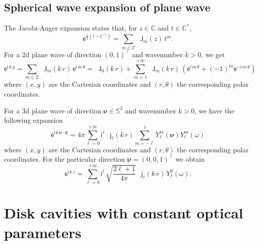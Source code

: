 \documentclass[12pt,a4paper]{article}
\theoremstyle{definition}
\theoremstyle{plain}
\theoremstyle{remark}
\newcommand{\bbC}{\mathbb{C}}
\newcommand{\bbS}{\mathbb{S}}
\newcommand{\bbZ}{\mathbb{Z}}
\newcommand{\ex}{\mathsf{e}}
\newcommand{\im}{\mathsf{i}}
\newcommand{\bJ}{\mathop{}\!\mathsf{J}}
\newcommand{\bj}{\mathop{}\!\mathsf{j}}
\newcommand{\plr}[1]{\left(#1\right)}
\newcommand{\vect}[1]{\boldsymbol{#1}}
\newcommand{\vx}{\boldsymbol{x}}
\begin{document}
\subsection{Spherical wave expansion of plane wave}\label{sec:plane_wave_expan}

The Jacobi-Anger expansion \cite[Eq.~10.12.1]{NIST:DLMF} states that, for $z \in \bbC$ and $t \in \bbC^*$,
\[
    \ex^{\frac{z}{2}(t-t^{-1})} = \sum_{m \in \bbZ} \bJ_m(z)\, t^m.
\]
For a 2d plane wave of direction $(0, 1)^\intercal$ and wavenumber $k > 0$, we get
\begin{equation}\label{eq:wave_expan_2}
    \ex^{\im\, k\, y} = \sum_{m \in \bbZ} \bJ_m(k\, r)\, \ex^{\im\, m\, \theta}
    = \bJ_0(k\, r) + \sum_{m = 1}^{+\infty} \bJ_m(k\, r)\, \plr{\ex^{\im\, m\, \theta} + (-1)^m\ex^{-\im\, m\, \theta}}
\end{equation}
where $(x, y)$ are the Cartesian coordinates and $(r, \theta)$ the corresponding polar coordinates.

\bigskip

For a 3d plane wave of direction $\vect{\nu} \in \bbS^2$ and wavenumber $k > 0$, we have the following expansion
\[
    \ex^{\im\, k\, \vect{\nu} \cdot \vx} = 4\pi \sum_{\ell = 0}^{+\infty} \im^\ell\, \bj_\ell(k\, r) \sum_{m = -\ell}^\ell Y_\ell^m(\vect{\nu}) \overline{Y_\ell^m(\omega)}
\]
where $(x, y)$ are the Cartesian coordinates and $(r, \theta)$ the corresponding polar coordinates.
For the particular direction $\vect{\nu} = (0, 0, 1)^\intercal$ we obtain
\begin{equation}\label{eq:wave_expan_3}
    \ex^{\im\, k\, z} = \sum_{\ell = 0}^{+\infty} \im^\ell \,\sqrt{\frac{2\ell+1}{4\pi}}\, \bj_\ell(k\, r)\, Y_\ell^0(\omega).
\end{equation}




\newpage

\section{Disk cavities with constant optical parameters}
\end{document}
